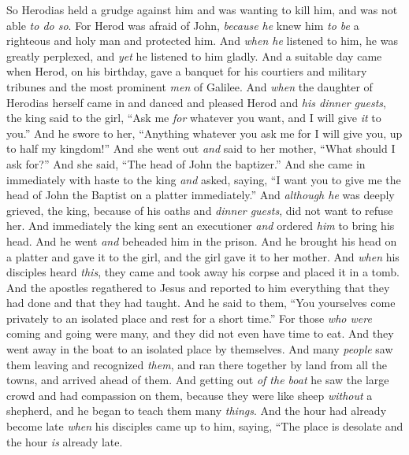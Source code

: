 \begin{biblechapter}
\verse So Herodias held a grudge against him and was wanting to kill him, and was not able \textit{to do so}.
\verse For Herod was afraid of John, \textit{because he} knew him \textit{to be} a righteous and holy man and protected him. And \textit{when he} listened to him, he was greatly perplexed, and \textit{yet} he listened to him gladly.
\verse And a suitable day came when Herod, on his birthday, gave a banquet for his courtiers and military tribunes and the most prominent \textit{men} of Galilee.
\verse And \textit{when} the daughter of Herodias herself came in and danced and pleased Herod and \textit{his dinner guests}, the king said to the girl, “Ask me \textit{for} whatever you want, and I will give \textit{it} to you.”
\verse And he swore to her, “Anything whatever you ask me for I will give you, up to half my kingdom!”
\verse And she went out \textit{and} said to her mother, “What should I ask for?” And she said, “The head of John the baptizer.”
\verse And she came in immediately with haste to the king \textit{and} asked, saying, “I want you to give me the head of John the Baptist on a platter immediately.”
\verse And \textit{although he} was deeply grieved, the king, because of his oaths and \textit{dinner guests}, did not want to refuse her.
\verse And immediately the king sent an executioner \textit{and} ordered \textit{him} to bring his head. And he went \textit{and} beheaded him in the prison.
\verse And he brought his head on a platter and gave it to the girl, and the girl gave it to her mother.
\verse And \textit{when} his disciples heard \textit{this}, they came and took away his corpse and placed it in a tomb.
 And the apostles regathered to Jesus and reported to him everything that they had done and that they had taught.
\verse And he said to them, “You yourselves come privately to an isolated place and rest for a short time.” For those \textit{who were} coming and going were many, and they did not even have time to eat.
\verse And they went away in the boat to an isolated place by themselves.
\verse And many \textit{people} saw them leaving and recognized \textit{them}, and ran there together by land from all the towns, and arrived ahead of them.
\verse And getting out \textit{of the boat} he saw the large crowd and had compassion on them, because they were like sheep \textit{without} a shepherd, and he began to teach them many \textit{things}.
\verse And the hour had already become late \textit{when} his disciples came up to him, saying, “The place is desolate and the hour \textit{is} already late.

\end{biblechapter}
